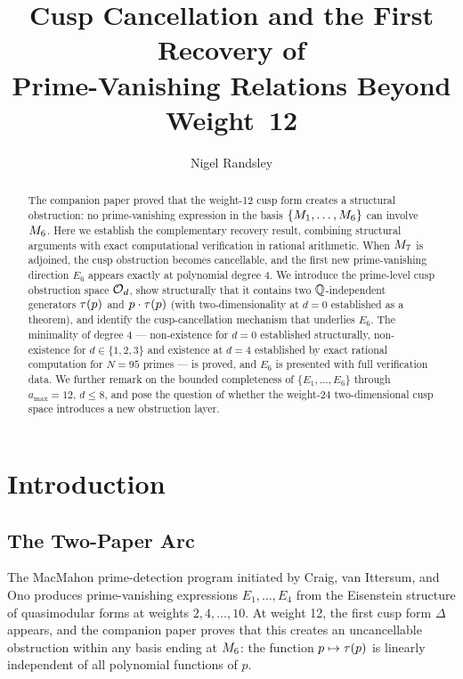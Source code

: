 \documentclass[11pt]{article}
\title{Cusp Cancellation and the First Recovery of\\
       Prime-Vanishing Relations Beyond Weight~12}
\author{Nigel Randsley}
\date{}
\begin{document}
\maketitle

\begin{abstract}
The companion paper \cite{Randsley2025a} proved that the weight-12 cusp form creates a
structural obstruction: no prime-vanishing expression in the basis
$\{M_{1},\dots,M_{6}\}$ can involve $M_{6}$.
Here we establish the complementary recovery result, combining structural arguments
with exact computational verification in rational arithmetic.
When $M_{7}$ is adjoined, the cusp obstruction becomes cancellable, and the first
new prime-vanishing direction $E_6$ appears exactly at polynomial degree $4$.
We introduce the prime-level cusp obstruction space $\mathcal{O}_d$, show structurally that
it contains two $\mathbb{Q}$-independent generators $\tau(p)$ and $p\cdot\tau(p)$
(with two-dimensionality at $d=0$ established as a theorem), and identify the
cusp-cancellation mechanism that underlies $E_6$.
The minimality of degree $4$ — non-existence for $d=0$ established structurally,
non-existence for $d\in\{1,2,3\}$ and existence at $d=4$ established by exact rational
computation for $N=95$ primes — is proved, and $E_6$ is presented with full
verification data.
We further remark on the bounded completeness of $\{E_1,\dots,E_6\}$ through
$a_{\max}=12$, $d\le 8$, and pose the question of whether the weight-24 two-dimensional
cusp space introduces a new obstruction layer.
\end{abstract}

\tableofcontents

\section{Introduction}
\label{sec:intro}

\subsection{The Two-Paper Arc}

The MacMahon prime-detection program initiated by Craig, van Ittersum, and Ono
\cite{CIO2024} produces prime-vanishing expressions $E_1,\dots,E_4$ from the Eisenstein
structure of quasimodular forms at weights $2,4,\dots,10$.
At weight 12, the first cusp form $\Delta$ appears, and the companion paper
\cite{Randsley2025a} proves that this creates an uncancellable obstruction within any
basis ending at $M_{6}$: the function $p\mapsto\tau(p)$ is linearly independent of all
polynomial functions of $p$.
\end{document}
